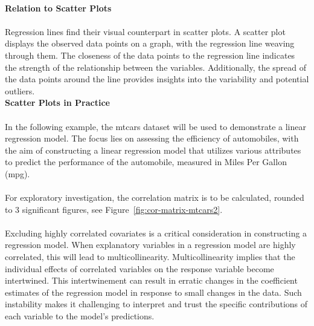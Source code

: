 \documentclass{article}\usepackage[]{graphicx}\usepackage[]{xcolor}
\begin{document}
\\\textbf{Relation to Scatter Plots}\\
\\Regression lines find their visual counterpart in scatter plots. A scatter plot displays the observed data points on a graph, with the regression line weaving through them. The closeness of the data points to the regression line indicates the strength of the relationship between the variables. Additionally, the spread of the data points around the line provides insights into the variability and potential outliers.\\


\noident \textbf{Scatter Plots in Practice}\\
\\In the following example, the mtcars dataset will be used to demonstrate a linear regression model. The focus lies on assessing the efficiency of automobiles, with the aim of constructing a linear regression model that utilizes various attributes to predict the performance of the automobile, measured in Miles Per Gallon (mpg).
\\  
\\For exploratory investigation, the correlation matrix is to be calculated, rounded to 3 significant figures, see Figure~\ref{fig:cor-matrix-mtcars2}. 
\\  
\\Excluding highly correlated covariates is a critical consideration in constructing a regression model. When explanatory variables in a regression model are highly correlated, this will lead to multicollinearity. Multicollinearity implies that the individual effects of correlated variables on the response variable become intertwined. This intertwinement can result in erratic changes in the coefficient estimates of the regression model in response to small changes in the data. Such instability makes it challenging to interpret and trust the specific contributions of each variable to the model's predictions\cite{multicoli}.
\end{document}
